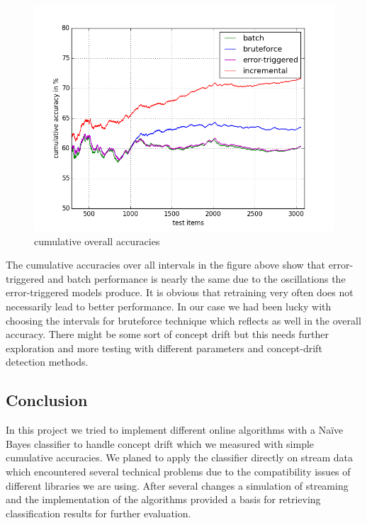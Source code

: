 \documentclass{article} %
\begin{document}
 \begin{figure}[htbp]
  \centering
  \includegraphics[scale=0.5]{./plots/allAcc.png}
  \caption{cumulative overall accuracies}
\end{figure}
The cumulative accuracies over all intervals in the figure above show that error-triggered and batch performance is nearly the same due to the oscillations the error-triggered models produce. It is obvious that retraining very often does not necessarily lead to better performance. In our case we had been lucky with choosing the intervals for bruteforce technique which reflects as well in the overall accuracy. There might be some sort of concept drift but this needs further exploration and more testing with different parameters and concept-drift detection methods.

\subsection{Conclusion}
In this project we tried to implement different online algorithms with a Na\"ive Bayes classifier to handle concept drift which we measured with simple cumulative accuracies. We planed to apply the classifier directly on stream data which encountered several technical problems due to the compatibility issues of different libraries we are using. After several changes a simulation of streaming and the implementation of the algorithms provided a basis for retrieving classification results for further evaluation.   
\end{document}
